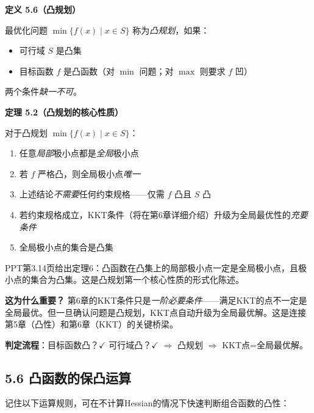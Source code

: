 \begin{defbox}
\textbf{定义 5.6（凸规划）}

最优化问题 $\min\{f(x) \mid x \in S\}$ 称为\emph{凸规划}，如果：
\begin{itemize}
  \item 可行域 $S$ 是凸集
  \item 目标函数 $f$ 是凸函数（对 $\min$ 问题；对 $\max$ 则要求 $f$ 凹）
\end{itemize}
两个条件\emph{缺一不可}。
\end{defbox}

\begin{defbox}
\textbf{定理 5.2（凸规划的核心性质）}

对于凸规划 $\min\{f(x) \mid x \in S\}$：
\begin{enumerate}
  \item 任意\emph{局部}极小点都是\emph{全局}极小点
  \item 若 $f$ 严格凸，则全局极小点\emph{唯一}
  \item 上述结论\emph{不需要}任何约束规格——仅需 $f$ 凸且 $S$ 凸
  \item 若约束规格成立，KKT条件（将在第6章详细介绍）升级为全局最优性的\emph{充要条件}
  \item 全局极小点的集合是凸集
\end{enumerate}
\end{defbox}

\medskip
PPT第3.14页给出定理6：凸函数在凸集上的局部极小点一定是全局极小点，且极小点的集合为凸集。这是凸规划第一个核心性质的形式化陈述。
\medskip
{}
\medskip

\begin{notebox}
\textbf{这为什么重要？} 第6章的KKT条件只是\emph{一阶必要条件}——满足KKT的点不一定是全局最优。但一旦确认问题是凸规划，KKT点自动升级为全局最优解。这是连接第5章（凸性）和第6章（KKT）的关键桥梁。

\textbf{判定流程}：目标函数凸？$\checkmark$ 可行域凸？$\checkmark$ $\Rightarrow$ 凸规划 $\Rightarrow$ KKT点=全局最优解。
\end{notebox}

\subsection{5.6 凸函数的保凸运算}

记住以下运算规则，可在不计算Hessian的情况下快速判断组合函数的凸性：

